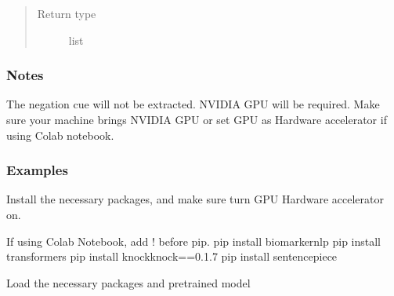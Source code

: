 \documentclass[letterpaper,10pt,english]{sphinxmanual}
\begin{document}
\begin{fulllineitems}
\begin{quote}
\begin{description}
\item[{Return type}] \leavevmode
\sphinxAtStartPar
list

\end{description}\end{quote}


\nopagebreak


\sphinxAtStartPar
{\hyperref[\detokenize{negation_cue_scope:negation_cue_scope.negation_detect}]{}}


\subsubsection*{Notes}

\sphinxAtStartPar
The negation cue will not be extracted.
NVIDIA GPU will be required. Make sure your machine brings NVIDIA GPU or set GPU as Hardware accelerator if using Colab notebook.
\subsubsection*{Examples}

\sphinxAtStartPar
Install the necessary packages, and make sure turn GPU Hardware accelerator on.

\begin{sphinxVerbatim}[commandchars=\\\{\}]
\PYGZgt{}\PYGZgt{}\PYGZgt{} If using Colab Notebook, add ! before pip.
\PYGZdl{} pip install biomarker\PYGZus{}nlp
\PYGZdl{} pip install transformers
\PYGZdl{} pip install knockknock==0.1.7
\PYGZdl{} pip install sentencepiece
\end{sphinxVerbatim}

\sphinxAtStartPar
Load the necessary packages and pre\sphinxhyphen{}trained model

\begin{sphinxVerbatim}[commandchars=\\\{\}]
   
   
   
   
\end{sphinxVerbatim}


\end{fulllineitems}
\end{document}
